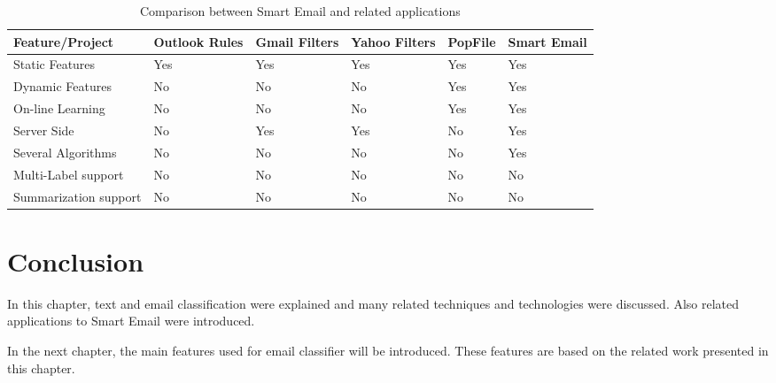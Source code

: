\begin{center}
    \begin{table}[H]
      \begin{tabular}{ | p{3cm} | p{2cm} | p{2cm} | p{2cm} | p{2cm} | p{2cm} |}
        \hline
        Feature/Project              & Outlook Rules \cite{OUTLOOK_REF} & Gmail Filters \cite{GMAIL_FILTERS} & 
        Yahoo Filters \cite{YAHOO_FILTERS} & PopFile \cite{POPFILE} & Smart Email\\ \hline
        Static Features  &    Yes        &    Yes        &    Yes      &    Yes  & \cellcolor[gray]{0.9}Yes \\ \hline     
        Dynamic Features &    No        &    No         &    No        &    Yes  & \cellcolor[gray]{0.9}Yes  \\ \hline
        On-line Learning &    No        &    No         &    No        &    Yes  & \cellcolor[gray]{0.9}Yes \\ \hline
        Server Side      &    No        &    Yes        &    Yes       &    No   & \cellcolor[gray]{0.9}Yes\\ \hline
        Several Algorithms &    No        &    No &    No       &    No   & \cellcolor[gray]{0.9}Yes\\ \hline
        Multi-Label support &    No        &    No &    No       &    No  & \cellcolor[gray]{0.9}No \\ \hline
        Summarization support&    No        &    No &    No       &    No & \cellcolor[gray]{0.9}No  \\ \hline
      \end{tabular}
      \caption[Comparison between Smart Email and related applications]
      {Comparison between Smart Email and related applications}
    \end{table}
\end{center}  

\section{Conclusion}
\label{sec:conclusion_2}
In this chapter, text and email classification were explained and many related techniques 
and technologies were discussed. Also related applications to Smart Email were introduced.

In the next chapter, the main features used for email classifier will be introduced. 
These features are based on the related work presented in this chapter.

